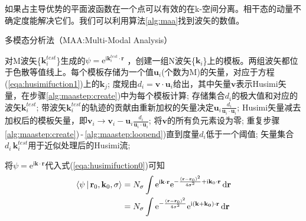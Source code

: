 \documentclass[UTF8]{ctexart}
\begin{document}
如果占主导优势的平面波函数在一个点可以有效的在k-空间分离。相干态的动量不确定度能解决它们。我们可以利用算法\ref{alg:maa}找到波矢的数值。

\begin{algorithm}[htb] 
    \caption{多模态分析法（MAA:Multi-Modal Analysis）}
    \label{alg:maa}
    \begin{algorithmic}[1]
        \STATE 对M波矢\{$\mathbf{k}^{test}_{i}$\}生成的$\psi=\mathrm{e}^{\mathrm{i}\mathbf{k}_i^{test}\cdot\mathbf{r}}$ ，创建一组N波矢\{$\mathbf{k}_i$\}上的模板。两组波矢都位于色散等值线上。每个模板存储为一个值$\mathbf{u}_i$(个数为M)的矢量，对应于方程(\ref{eqa:husimifuction1})上的$\mathbf{k}_j$;
        \label{alg:maastep:create}
        \STATE 度规由$d_i=\mathbf{v}\cdot\mathbf{u}_i$给出，其中矢量$\mathbf{v}$表示Husimi矢量，在步骤\ref{alg:maastep:create})中为每个模板计算;
        \STATE 存储集合{$d_i$}的极大值和对应的波矢$\mathbf{k}^{test}_i$;
        \STATE 带波矢$\mathbf{k}^{test}_i$的轨迹的贡献由重新加权的矢量决定$\mathbf{u}_i\frac{d_i}{\mathbf{u}_i\cdot\mathbf{u}_i}$;
        \STATE Husimi矢量减去加权后的模板矢量，即$\mathbf{v}_i \rightarrow \mathbf{v}_i - \mathbf{u}_i\frac{d_i}{\mathbf{u}_i\cdot\mathbf{u}_i}$;
        \STATE 将$\mathbf{v}$的所有负元素设为零;
        \label {alg:maastep:loopend}
        \STATE 重复步骤\ref{alg:maastep:create})\,-\,\ref{alg:maastep:loopend})直到度量$d_i$低于一个阈值;
        \STATE 矢量集合{$d_i\,\mathbf{k}^{test}_i$}用于近似处理后的Husimi流;
    \end{algorithmic}
\end{algorithm}

将$\psi=\mathrm{e}^{\mathrm{i}\mathbf{k}\cdot\mathbf{r}}$代入式(\ref{eqa:husimifuction0})可知
\begin{equation}
    \begin{aligned}
        \Braket{\mathbf{\psi}|\mathbf{r}_0,\mathbf{k}_0,\sigma}&=N_\sigma \int \mathrm{e}^{\mathrm{i}\mathbf{k}\cdot\mathbf{r}}\mathrm{e}^{-\frac{(\mathbf{r}-\mathbf{r}_0)^2}{4\sigma^2}+\mathrm{i}\mathbf{k}_0\cdot\mathbf{r}}\,\mathrm{d}\mathbf{r}\\       
                                                               &=N_\sigma \int \mathrm{e}^{-\frac{(\mathbf{r}-\mathbf{r}_0)^2}{4\sigma^2}}\mathrm{e}^{\mathrm{i}(\mathbf{k}+\mathbf{k_0})\cdot\mathbf{r}}\,\mathrm{d}\mathbf{r}
    \end{aligned}
\end{equation}
\end{document}
